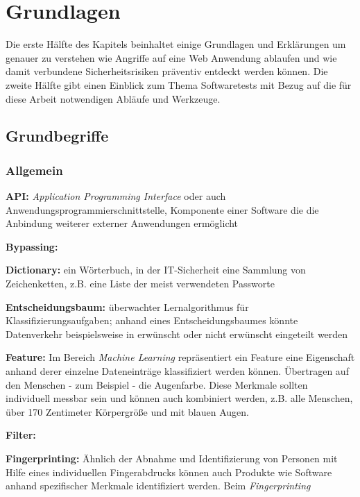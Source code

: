 \chapter{Grundlagen}



Die erste Hälfte des Kapitels beinhaltet einige Grundlagen und Erklärungen um genauer zu verstehen wie Angriffe auf eine Web Anwendung ablaufen und wie damit verbundene Sicherheitsrisiken präventiv entdeckt werden können. Die zweite Hälfte gibt einen Einblick zum Thema Softwaretests mit Bezug auf die für diese Arbeit notwendigen Abläufe und Werkzeuge. 

\section{Grundbegriffe}

\subsection{Allgemein}

\textbf{API:} \emph{Application Programming Interface} oder auch Anwendungsprogrammierschnittstelle, Komponente einer Software die die Anbindung weiterer externer Anwendungen ermöglicht

\textbf{Bypassing:}

\textbf{Dictionary:} ein Wörterbuch, in der IT-Sicherheit eine Sammlung von Zeichenketten, z.B. eine Liste der meist verwendeten Passworte

\textbf{Entscheidungsbaum:} überwachter Lernalgorithmus für Klassifizierungsaufgaben; anhand eines Entscheidungsbaumes könnte Datenverkehr beispielsweise in erwünscht oder nicht erwünscht eingeteilt werden

\textbf{Feature:} Im Bereich \emph{Machine Learning} repräsentiert ein Feature eine Eigenschaft anhand derer einzelne Dateneinträge klassifiziert werden können. Übertragen auf den Menschen - zum Beispiel - die Augenfarbe. Diese Merkmale sollten individuell messbar sein und können auch kombiniert werden, z.B. alle Menschen, über 170 Zentimeter Körpergröße und mit blauen Augen. 

\textbf{Filter:}

\textbf{Fingerprinting:} Ähnlich der Abnahme und Identifizierung von Personen mit Hilfe eines individuellen Fingerabdrucks können auch Produkte wie Software anhand spezifischer Merkmale identifiziert werden. Beim \emph{Fingerprinting}

